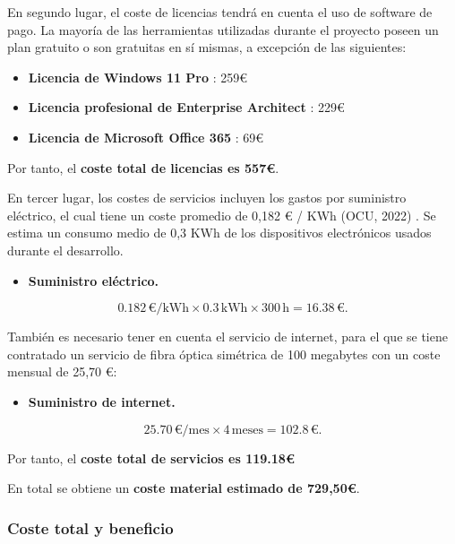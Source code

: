 En segundo lugar, el coste de licencias tendrá en cuenta el uso de software de pago. La mayoría de las herramientas utilizadas durante el proyecto poseen un plan gratuito o son gratuitas en sí mismas, a excepción de las siguientes:

\begin{itemize}
    \item \textbf{Licencia de Windows 11 Pro} \cite{licenciaWindows}: 259€
    \item \textbf{Licencia profesional de Enterprise Architect} \cite{licenciaEA}: 229€
    \item \textbf{Licencia de Microsoft Office 365} \cite{licenciaOffice}: 69€
\end{itemize}

Por tanto, el \textbf{coste total de licencias es 557€}.

En tercer lugar, los costes de servicios incluyen los gastos por suministro eléctrico, el cual tiene un coste promedio de 0,182 € / KWh (OCU, 2022) . Se estima un consumo medio de 0,3 KWh de los dispositivos electrónicos usados durante el desarrollo.

\begin{itemize}
    \item \textbf{Suministro eléctrico.}
\end{itemize}

\begin{equation}
0.182 \, \text{€/kWh} \times 0.3 \, \text{kWh} \times 300 \, \text{h} = 16.38 \, \text{€}.
\end{equation}

También es necesario tener en cuenta el servicio de internet, para el que se tiene contratado un servicio de fibra óptica simétrica de 100 megabytes con un coste mensual de 25,70 €:

\begin{itemize}
    \item \textbf{Suministro de internet.}
\end{itemize}

\begin{equation}
25.70 \, \text{€/mes} \times 4 \, \text{meses} = 102.8 \, \text{€}.
\end{equation}

Por tanto, el \textbf{coste total de servicios es 119.18€}

En total se obtiene un \textbf{coste material estimado de 729,50€}.

\subsubsection{Coste total y beneficio}

